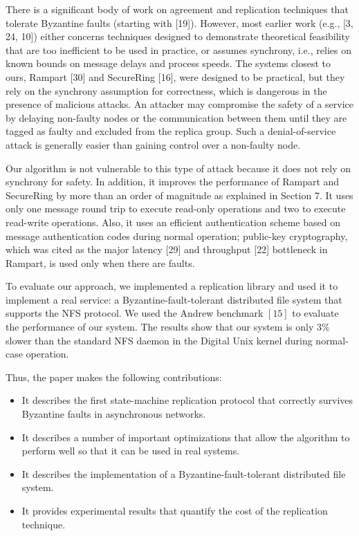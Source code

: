 \documentclass[
]{article}
\begin{document}
There is a significant body of work on agreement and replication
techniques that tolerate Byzantine faults (starting with {[}19{]}).
However, most earlier work (e.g., {[}3, 24, 10{]}) either concerns
techniques designed to demonstrate theoretical feasibility that are too
inefficient to be used in practice, or assumes synchrony, i.e., relies
on known bounds on message delays and process speeds. The systems
closest to ours, Rampart {[}30{]} and SecureRing {[}16{]}, were designed
to be practical, but they rely on the synchrony assumption for
correctness, which is dangerous in the presence of malicious attacks. An
attacker may compromise the safety of a service by delaying non-faulty
nodes or the communication between them until they are tagged as faulty
and excluded from the replica group. Such a denial-of-service attack is
generally easier than gaining control over a non-faulty node.

Our algorithm is not vulnerable to this type of attack because it does
not rely on synchrony for safety. In addition, it improves the
performance of Rampart and SecureRing by more than an order of magnitude
as explained in Section 7. It uses only one message round trip to
execute read-only operations and two to execute read-write operations.
Also, it uses an efficient authentication scheme based on message
authentication codes during normal operation; public-key cryptography,
which was cited as the major latency {[}29{]} and throughput {[}22{]}
bottleneck in Rampart, is used only when there are faults.

To evaluate our approach, we implemented a replication library and used
it to implement a real service: a Byzantine-fault-tolerant distributed
file system that supports the NFS protocol. We used the Andrew benchmark
\([15]\) to evaluate the performance of our system. The results show
that our system is only 3\% slower than the standard NFS daemon in the
Digital Unix kernel during normal-case operation.

Thus, the paper makes the following contributions:

\begin{itemize}
\item
  It describes the first state-machine replication protocol that
  correctly survives Byzantine faults in asynchronous networks.\\
\item
  It describes a number of important optimizations that allow the
  algorithm to perform well so that it can be used in real systems.
\item
  It describes the implementation of a Byzantine-fault-tolerant
  distributed file system.\\
\item
  It provides experimental results that quantify the cost of the
  replication technique.
\end{itemize}
\end{document}
